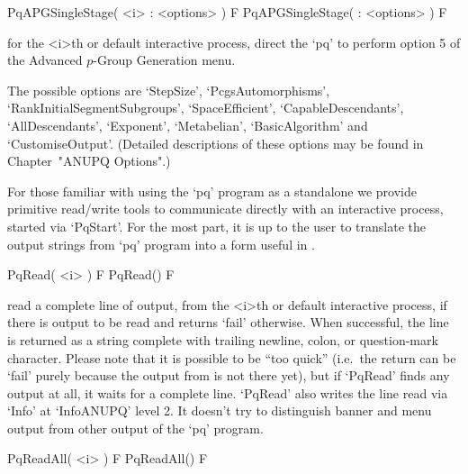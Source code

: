
\>PqAPGSingleStage( <i> : <options> ) F
\>PqAPGSingleStage( : <options> ) F


for the <i>th or default interactive {\ANUPQ} process,  direct  the  `pq'
to perform option 5 of the Advanced $p$-Group Generation menu.

The    possible     options    are    `StepSize',    `PcgsAutomorphisms',
`RankInitialSegmentSubgroups',   `SpaceEfficient',  `CapableDescendants',
`AllDescendants',   `Exponent',    `Metabelian',   `BasicAlgorithm'   and
`CustomiseOutput'. (Detailed  descriptions of these options  may be found
in Chapter~"ANUPQ Options".)



For those familiar with using the `pq' program as a standalone we  provide
primitive read/write tools to communicate directly  with  an  interactive
{\ANUPQ} process, started via `PqStart'. For the most part, it is  up  to
the user to translate the output strings from `pq'  program  into  a  form
useful in {\GAP}.

\>PqRead( <i> ) F
\>PqRead() F

read a complete line of  {\ANUPQ}  output,  from  the  <i>th  or  default
interactive {\ANUPQ} process, if there is output to be read  and  returns
`fail' otherwise. When successful, the  line  is  returned  as  a  string
complete with trailing newline, colon, or question-mark character. Please
note that it is possible to be ``too  quick''  (i.e.~the  return  can  be
`fail' purely because the output from {\ANUPQ} is not there yet), but  if
`PqRead' finds any output at all, it waits for a complete line.  `PqRead'
also writes the line read via `Info' at `InfoANUPQ' level 2.  It  doesn't
try to distinguish banner and menu output from other output of  the  `pq'
program.

\>PqReadAll( <i> ) F
\>PqReadAll() F


